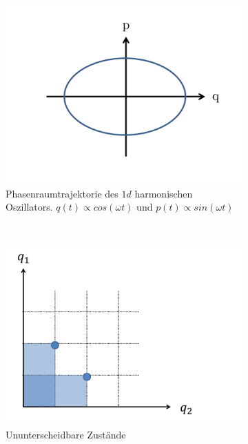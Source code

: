 \documentclass[12pt]{article}
\begin{document}
\begin{figure}[h]
		\begin{subfigure}[h]{0.5 \textwidth}
		\centering
		\includegraphics[width=\textwidth]{Folie1.png}
		\caption{Phasenraumtrajektorie des $1d$ harmonischen Oszillators. $q(t) \propto cos( \omega t)$ und $p(t) \propto sin(\omega t)$} 
		\label{fig:Phasenraum}
		\centering
	\end{subfigure}
	~
	\begin{subfigure}[h]{0.5\textwidth}
		\centering
		\includegraphics[width=\textwidth]{Folie2.png}
		\caption{Ununterscheidbare Zustände} 
		\label{fig:unterscheidbar}
		\centering
	\end{subfigure}
	\caption{ }
\end{figure}
\end{document}
